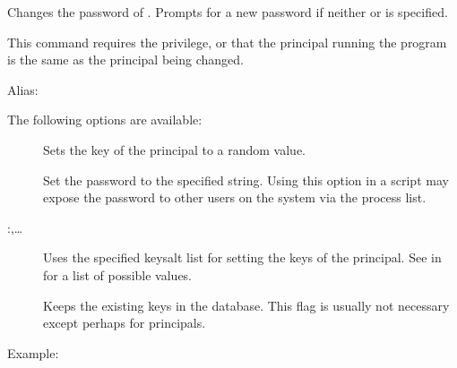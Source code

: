 \documentclass[letterpaper,10pt,english]{sphinxmanual}
\begin{document}
Changes the password of .  Prompts for a new password if
neither  or  is specified.

This command requires the  privilege, or that the
principal running the program is the same as the principal being
changed.

Alias: 

The following options are available:
\begin{description}
\item[{}] \leavevmode
Sets the key of the principal to a random value.

\item[{ }] \leavevmode
Set the password to the specified string.  Using this option in a
script may expose the password to other users on the system via
the process list.

\item[{ :,…}] \leavevmode
Uses the specified keysalt list for setting the keys of the
principal.  See {\hyperref[\detokenize{admin/conf_files/kdc_conf:keysalt-lists}]{}} in {\hyperref[\detokenize{admin/conf_files/kdc_conf:kdc-conf-5}]{}} for a
list of possible values.

\item[{}] \leavevmode
Keeps the existing keys in the database.  This flag is usually not
necessary except perhaps for  principals.

\end{description}

Example:

%
\begin{sphinxVerbatim}[commandchars=\\\{\}]
  
    
    
   
\end{sphinxVerbatim}
\end{document}
